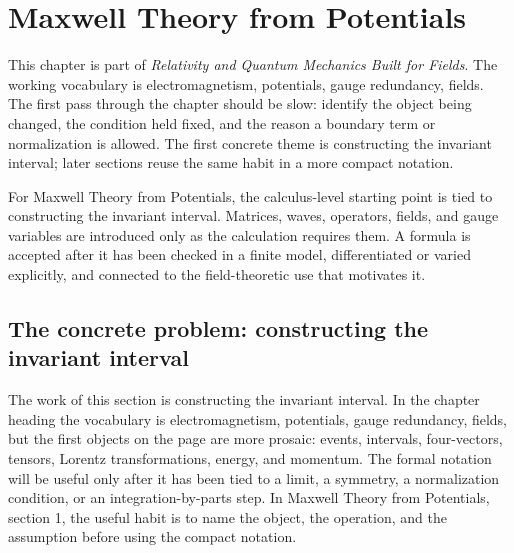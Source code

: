 \chapter{Maxwell Theory from Potentials}


This chapter is part of \emph{Relativity and Quantum Mechanics Built for Fields}.  The working vocabulary is electromagnetism, potentials, gauge redundancy, fields.  The first pass through the chapter should be slow: identify the object being changed, the condition held fixed, and the reason a boundary term or normalization is allowed.  The first concrete theme is constructing the invariant interval; later sections reuse the same habit in a more compact notation.

For Maxwell Theory from Potentials, the calculus-level starting point is tied to constructing the invariant interval.  Matrices, waves, operators, fields, and gauge variables are introduced only as the calculation requires them.  A formula is accepted after it has been checked in a finite model, differentiated or varied explicitly, and connected to the field-theoretic use that motivates it.

\section{The concrete problem: constructing the invariant interval}













The work of this section is constructing the invariant interval.  In the chapter heading the vocabulary is electromagnetism, potentials, gauge redundancy, fields, but the first objects on the page are more prosaic: events, intervals, four-vectors, tensors, Lorentz transformations, energy, and momentum.  The formal notation will be useful only after it has been tied to a limit, a symmetry, a normalization condition, or an integration-by-parts step.  In Maxwell Theory from Potentials, section 1, the useful habit is to name the object, the operation, and the assumption before using the compact notation.

